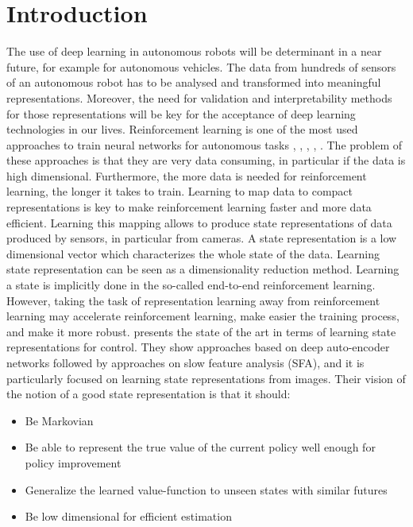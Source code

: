 \documentclass[a4paper]{article}
\newcommand{\natalia}[1]{\todo[color=green!60,inline]{#1}}
\begin{document}
\section{Introduction}
The use of deep learning in autonomous robots will be determinant in a near future, for example for autonomous vehicles. The data from hundreds of sensors of an autonomous robot has to be analysed and transformed into meaningful representations. Moreover, the need for validation and interpretability methods for those representations will be key for the acceptance of deep learning technologies in our lives. 
Reinforcement learning is one of the most used approaches to train neural networks for autonomous tasks \cite{Mnih15}, \cite{Lillicrap15}, \cite{Schulman15}, \cite{Wu17}, \cite{Schulman17}. The problem of these approaches is that they are very data consuming, in particular if the data is high dimensional. Furthermore, the more data is needed for reinforcement learning, the longer it takes to train. Learning to map data to compact representations is key to make reinforcement learning faster and more data efficient. Learning this mapping allows to produce state representations of data produced by sensors, in particular from cameras. A state representation is a low dimensional vector which characterizes the whole state of the data. Learning state representation can be seen as a dimensionality reduction method. Learning a state is implicitly done in the so-called end-to-end reinforcement learning. 
However, taking the task of representation learning away from reinforcement learning may accelerate reinforcement learning, make easier the training process, and make it more robust. \natalia{citations here}
\cite{Bohmer15} presents the state of the art in terms of learning state representations for control. They show approaches based on deep auto-encoder networks followed by approaches on slow feature analysis (SFA), and it is particularly focused on learning state representations from images. Their vision of the notion of a good state representation is that it should: %
\begin{itemize}
\item Be Markovian
\item Be able  to represent  the  true  value of  the current policy well enough for policy improvement
\item Generalize the learned value-function to unseen states with similar futures
\item Be low dimensional for efficient estimation
\end{itemize}
\end{document}
